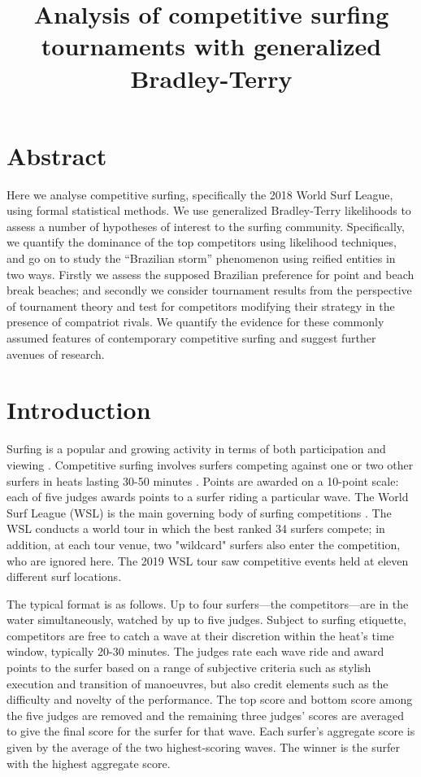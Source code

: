 \documentclass{article}
\begin{document}


\title{Analysis of competitive surfing tournaments with generalized Bradley-Terry}


\section*{Abstract}
Here we analyse competitive surfing, specifically the 2018 World Surf
League, using formal statistical methods.  We use generalized
Bradley-Terry likelihoods to assess a number of hypotheses of interest
to the surfing community.  Specifically, we quantify the dominance of
the top competitors using likelihood techniques, and go on to study
the ``Brazilian storm'' phenomenon using reified entities in two ways.
Firstly we assess the supposed Brazilian preference for point and
beach break beaches; and secondly we consider tournament results from
the perspective of tournament theory and test for competitors
modifying their strategy in the presence of compatriot rivals.  We
quantify the evidence for these commonly assumed features of
contemporary competitive surfing and suggest further avenues of
research.

\section{Introduction}

Surfing is a popular and growing activity in terms of both
participation and viewing \cite{warshaw2010}.  Competitive surfing
involves surfers competing against one or two other surfers in heats
lasting 30-50 minutes \cite{booth1995}.  Points are awarded on a
10-point scale: each of five judges awards points to a surfer riding a
particular wave.  The World Surf League (WSL) is the main governing
body of surfing competitions \cite{wsl}.  The WSL conducts a world tour in
which the best ranked 34 surfers compete; in addition, at each tour
venue, two "wildcard" surfers also enter the competition, who are
ignored here.  The 2019 WSL tour saw competitive events held at eleven
different surf locations.

The typical format is as follows.  Up to four surfers---the
competitors---are in the water simultaneously, watched by up to five
judges.  Subject to surfing etiquette, competitors are free to catch a
wave at their discretion within the heat's time window, typically
20-30 minutes.  The judges rate each wave ride and award points to the
surfer based on a range of subjective criteria such as stylish
execution and transition of manoeuvres, but also credit elements such
as the difficulty and novelty of the performance.  The top score and
bottom score among the five judges are removed and the remaining three
judges' scores are averaged to give the final score for the surfer for
that wave.  Each surfer's aggregate score is given by the average of
the two highest-scoring waves.  The winner is the surfer with the
highest aggregate score.
\end{document}
